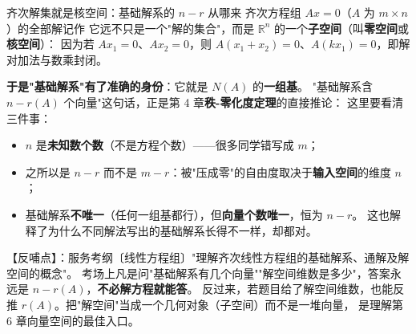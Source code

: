 
\begin{fdeep}{齐次解集就是核空间：基础解系的 $n-r$ 从哪来}
齐次方程组 $Ax=0$（$A$ 为 $m\times n$）的全部解记作
它远不只是一个"解的集合"，而是 $\mathbb{R}^{n}$ 的一个\textbf{子空间}（叫\textbf{零空间}或\textbf{核空间}）：
因为若 $Ax_1=0$、$Ax_2=0$，则 $A(x_1+x_2)=0$、$A(kx_1)=0$，即解对加法与数乘封闭。

\medskip
\textbf{于是"基础解系"有了准确的身份}：它就是 $N(A)$ 的\textbf{一组基}。
"基础解系含 $n-r(A)$ 个向量"这句话，正是第 4 章\textbf{秩-零化度定理}的直接推论：
这里要看清三件事：
\begin{itemize}[leftmargin=2.2em,itemsep=0.25em]
\item $n$ 是\textbf{未知数个数}（不是方程个数）——很多同学错写成 $m$；
\item 之所以是 $n-r$ 而不是 $m-r$：被"压成零"的自由度取决于\textbf{输入空间}的维度 $n$；
\item 基础解系\textbf{不唯一}（任何一组基都行），但\textbf{向量个数唯一}，恒为 $n-r$。
      这也解释了为什么不同解法写出的基础解系长得不一样，却都对。
\end{itemize}
【反哺点】：服务考纲〔线性方程组〕"理解齐次线性方程组的基础解系、通解及解空间的概念"。
考场上凡是问"基础解系有几个向量""解空间维数是多少"，答案永远是 $n-r(A)$，\textbf{不必解方程就能答}。
反过来，若题目给了解空间维数，也能反推 $r(A)$。把"解空间"当成一个几何对象（子空间）而不是一堆向量，
是理解第 6 章向量空间的最佳入口。
\end{fdeep}

